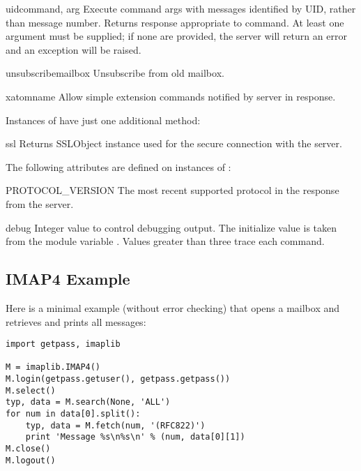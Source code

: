 \begin{methoddesc}[IMAP4]{uid}{command, arg}
  Execute command args with messages identified by UID, rather than
  message number.  Returns response appropriate to command.  At least
  one argument must be supplied; if none are provided, the server will
  return an error and an exception will be raised.
\end{methoddesc}

\begin{methoddesc}[IMAP4]{unsubscribe}{mailbox}
  Unsubscribe from old mailbox.
\end{methoddesc}

\begin{methoddesc}[IMAP4]{xatom}{name}
  Allow simple extension commands notified by server in
   response.
\end{methoddesc}


Instances of  have just one additional method:

\begin{methoddesc}{ssl}{}
  Returns SSLObject instance used for the secure connection with the server.
\end{methoddesc}


The following attributes are defined on instances of :


\begin{memberdesc}[IMAP4]{PROTOCOL_VERSION}
The most recent supported protocol in the
 response from the server.
\end{memberdesc}

\begin{memberdesc}[IMAP4]{debug}
Integer value to control debugging output.  The initialize value is
taken from the module variable .  Values greater than
three trace each command.
\end{memberdesc}


\subsection{IMAP4 Example \label{imap4-example}}

Here is a minimal example (without error checking) that opens a
mailbox and retrieves and prints all messages:

\begin{verbatim}
import getpass, imaplib

M = imaplib.IMAP4()
M.login(getpass.getuser(), getpass.getpass())
M.select()
typ, data = M.search(None, 'ALL')
for num in data[0].split():
    typ, data = M.fetch(num, '(RFC822)')
    print 'Message %s\n%s\n' % (num, data[0][1])
M.close()
M.logout()
\end{verbatim}
